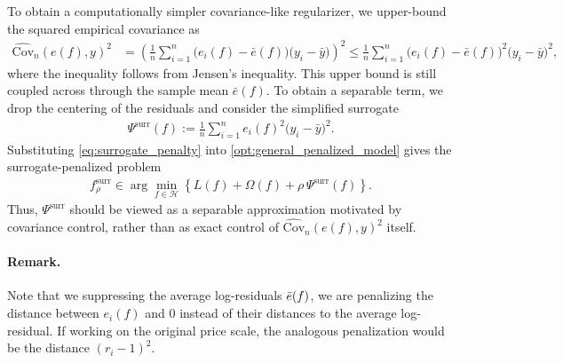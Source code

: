 \documentclass[12pt, draft]{article}
\theoremstyle{plain}
\theoremstyle{definition}
\newcommand{\1}{\mathbf{1}}
\newcommand{\Cov}{\text{Cov}}
\renewcommand{\H}{\mathcal{H}}
\begin{document}
To obtain a computationally simpler covariance-like regularizer, we upper-bound the squared empirical covariance as
\begin{align}
    \label{eq:covariance_upper_bound}
    \widehat{\Cov}_n(e(f),y)^2
    &=
    \left(
        \frac{1}{n}\sum_{i=1}^n
        \bigl(e_i(f)-\bar e(f)\bigr)\bigl(y_i-\bar y\bigr)
    \right)^2
    \le
    \frac{1}{n}\sum_{i=1}^n
    \bigl(e_i(f)-\bar e(f)\bigr)^2
    \bigl(y_i-\bar y\bigr)^2,
\end{align}
where the inequality follows from Jensen's inequality. This upper bound is still coupled across through the sample mean $\bar e(f)$. To obtain a separable term, we drop the centering of the residuals and consider the simplified surrogate
\begin{align}
    \label{eq:surrogate_penalty}
    \Psi^{\mathrm{surr}}(f)
    :=
    \frac{1}{n}\sum_{i=1}^n
    e_i(f)^2\bigl(y_i-\bar y\bigr)^2.
\end{align}
Substituting \eqref{eq:surrogate_penalty} into \eqref{opt:general_penalized_model} gives the surrogate-penalized problem
\begin{align}
    \label{opt:surrogate_penalized_model}
    f_{\rho}^{\mathrm{surr}}
    \in
    \arg\min_{f\in\H}
    \left\{
        L(f)+\Omega(f)
        +
        \rho\,\Psi^{\mathrm{surr}}(f)
    \right\}.
\end{align}
Thus, $\Psi^{\mathrm{surr}}$ should be viewed as a separable approximation motivated by covariance control, rather than as exact control of $\widehat{\Cov}_n(e(f),y)^2$ itself.

\paragraph{Remark.} Note that we suppressing the average log-residuals $\Bar e(f)$, we are penalizing the distance between $e_i(f)$ and 0 instead of their distances to the average log-residual. If working on the original price scale, the analogous penalization would be the distance $(r_i - 1)^2$.  


\end{document}
